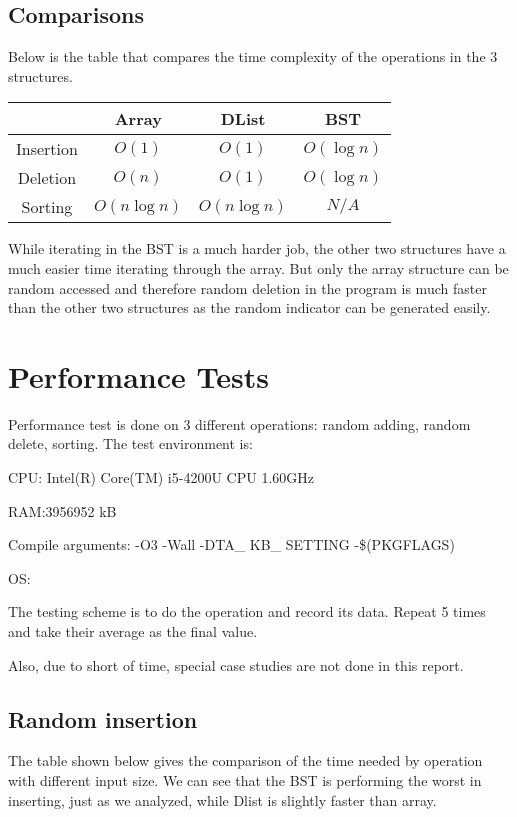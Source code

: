 \documentclass{article}
\begin{document}
	\subsection{Comparisons}
		Below is the table that compares the time complexity of the operations in the 3 structures.
		
		
\begin{center}	
	
		\begin{tabular}{|c|c|c|c|}
		 \hline 
		 \rule[-1ex]{0pt}{2.5ex} & Array & DList & BST \\ 
		 \hline 
		 \rule[-1ex]{0pt}{2.5ex} Insertion & $O(1)$ & $O(1)$ & $O(\log n)$ \\ 
		 \hline 
		 \rule[-1ex]{0pt}{2.5ex} Deletion & $O(n)$ & $O(1)$ & $O(\log n)$ \\ 
		 \hline
		  \rule[-1ex]{0pt}{2.5ex} Sorting & $O(n\log n)$ & $O(n \log n)$ & $N/A$ \\ 
		 \hline 
		 \end{tabular}  
\end{center}	
	While iterating in the BST is a much harder job, the other two structures have a much easier time iterating through the array. 
	But only the array structure can be random accessed and therefore random deletion in the program is much faster than the other two structures as the random indicator can be generated easily. 
	\pagebreak	
	\section{Performance Tests}
	Performance test is done on 3 different operations: random adding, random delete, sorting.
	The test environment is: 
	\begin{list}{•}
	\item CPU: Intel(R) Core(TM) i5-4200U CPU \@ 1.60GHz
	\item RAM:3956952 kB
	\item Compile arguments: -O3 -Wall -DTA\_ KB\_ SETTING -\$(PKGFLAGS)
	\item OS: \\
	
\end{list}	 	

	The testing scheme is to do the operation and record its data. Repeat 5 times and take their average as the final value. 
	
	Also, due to short of time, special case studies are not done in this report.
	\subsection{Random insertion}
	The table shown below gives the comparison of the time needed by operation with different input size. We can see that the BST is performing the worst in inserting, just as we analyzed, while Dlist is slightly faster than array.
	
\end{document}

